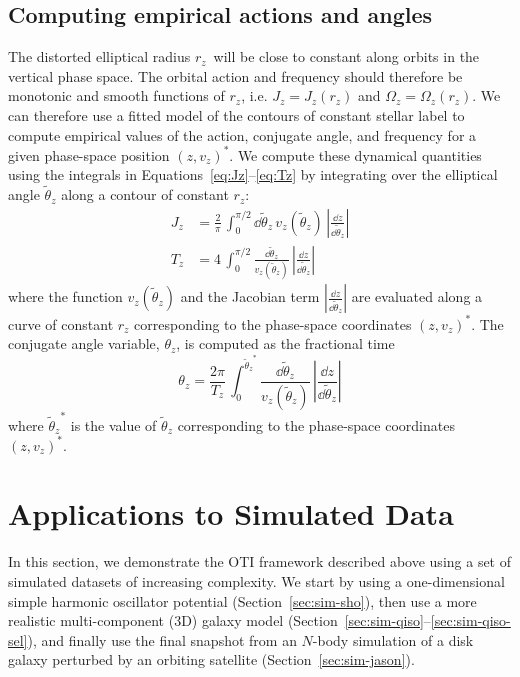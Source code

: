 \documentclass[modern]{aastex631}
\newcommand{\rz}{\ensuremath{r_z}}
\newcommand{\thzp}{\ensuremath{\tilde{\theta}_z}}
\begin{document}
\subsection{Computing empirical actions and angles}
\label{sec:empirical-aaf}

The distorted elliptical radius \rz\ will be close to constant along orbits in the
vertical phase space.
The orbital action and frequency should therefore be monotonic and smooth functions of
\rz, i.e. $J_z = J_z(\rz)$ and $\Omega_z = \Omega_z(\rz)$.
We can therefore use a fitted model of the contours of constant stellar label to compute
empirical values of the action, conjugate angle, and frequency for a given phase-space
position $(z, v_z)^*$.
We compute these dynamical quantities using the integrals in
Equations~\ref{eq:Jz}--\ref{eq:Tz} by integrating over the elliptical angle $\thzp$
along a contour of constant $\rz$:
\begin{align}
    J_z &= \frac{2}{\pi} \, \int_0^{\pi/2} \dd \thzp \, v_z(\thzp)
        \, \left|\frac{\dd z}{\dd \thzp}\right| \label{eq:Jz-ell} \\
    T_z &= 4 \, \int_0^{\pi/2} \frac{\dd \thzp}{v_z(\thzp)}
        \, \left|\frac{\dd z}{\dd \thzp}\right| \label{eq:Tz-ell}
\end{align}
where the function $v_z(\thzp)$ and the Jacobian term $\left|\frac{\dd z}{\dd
\thzp}\right|$ are evaluated along a curve of constant $\rz$ corresponding to the
phase-space coordinates $(z, v_z)^*$.
The conjugate angle variable, $\theta_z$, is computed as the fractional time
\begin{equation}
    \theta_z = \frac{2\pi}{T_z} \, \int_0^{\thzp^*} \frac{\dd \thzp}{v_z(\thzp)}
        \, \left|\frac{\dd z}{\dd \thzp}\right| \label{eq:thz-ell}
\end{equation}
where $\thzp^*$ is the value of $\thzp$ corresponding to the phase-space coordinates
$(z, v_z)^*$.

\section{Applications to Simulated Data} \label{sec:applications-sim}

In this section, we demonstrate the OTI framework described above using a set of
simulated datasets of increasing complexity.
We start by using a one-dimensional simple harmonic oscillator potential
(Section~\ref{sec:sim-sho}), then use a more realistic multi-component (3D) galaxy model
(Section~\ref{sec:sim-qiso}--\ref{sec:sim-qiso-sel}), and finally use the final snapshot
from an $N$-body simulation of a disk galaxy perturbed by an orbiting satellite
(Section~\ref{sec:sim-jason}).
\end{document}
